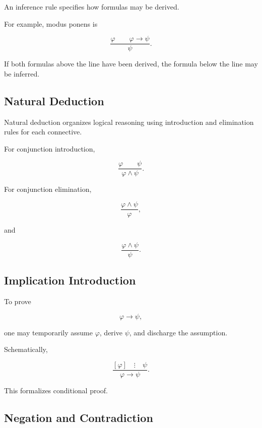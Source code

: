 An inference rule specifies how formulas may be derived.

For example, modus ponens is

\[
\boxed{
\frac{
\varphi
\qquad
\varphi\rightarrow\psi
}{
\psi
}.
}
\]

If both formulas above the line have been derived, the formula below the
line may be inferred.

\subsection{Natural Deduction}
\label{subsec:natural-deduction}

Natural deduction organizes logical reasoning using introduction and
elimination rules for each connective.

For conjunction introduction,

\[
\boxed{
\frac{
\varphi
\qquad
\psi
}{
\varphi\land\psi
}.
}
\]

For conjunction elimination,

\[
\boxed{
\frac{
\varphi\land\psi
}{
\varphi
},
}
\]

and

\[
\boxed{
\frac{
\varphi\land\psi
}{
\psi
}.
}
\]

\subsection{Implication Introduction}
\label{subsec:implication-introduction}

To prove

\[
\varphi\rightarrow\psi,
\]

one may temporarily assume \(\varphi\), derive \(\psi\), and discharge the
assumption.

Schematically,

\[
\boxed{
\frac{
[\varphi]
\quad
\vdots
\quad
\psi
}{
\varphi\rightarrow\psi
}.
}
\]

This formalizes conditional proof.

\subsection{Negation and Contradiction}
\label{subsec:formal-negation-contradiction}

